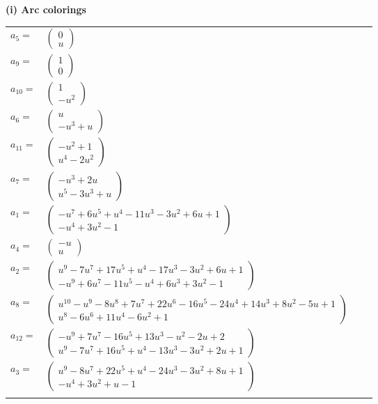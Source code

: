 \documentclass[1p]{elsarticle_modified}
\theoremstyle{definition}
\begin{document}
\flushleft \textbf{(i) Arc colorings}\\
\begin{tabular}{m{7pt} m{180pt} m{7pt} m{180pt} }
\flushright $a_{5}=$&$\begin{pmatrix}0\\u\end{pmatrix}$ \\
\flushright $a_{9}=$&$\begin{pmatrix}1\\0\end{pmatrix}$ \\
\flushright $a_{10}=$&$\begin{pmatrix}1\\- u^2\end{pmatrix}$ \\
\flushright $a_{6}=$&$\begin{pmatrix}u\\- u^3+u\end{pmatrix}$ \\
\flushright $a_{11}=$&$\begin{pmatrix}- u^2+1\\u^4-2 u^2\end{pmatrix}$ \\
\flushright $a_{7}=$&$\begin{pmatrix}- u^3+2 u\\u^5-3 u^3+u\end{pmatrix}$ \\
\flushright $a_{1}=$&$\begin{pmatrix}- u^7+6 u^5+u^4-11 u^3-3 u^2+6 u+1\\- u^4+3 u^2-1\end{pmatrix}$ \\
\flushright $a_{4}=$&$\begin{pmatrix}- u\\u\end{pmatrix}$ \\
\flushright $a_{2}=$&$\begin{pmatrix}u^9-7 u^7+17 u^5+u^4-17 u^3-3 u^2+6 u+1\\- u^9+6 u^7-11 u^5- u^4+6 u^3+3 u^2-1\end{pmatrix}$ \\
\flushright $a_{8}=$&$\begin{pmatrix}u^{10}- u^9-8 u^8+7 u^7+22 u^6-16 u^5-24 u^4+14 u^3+8 u^2-5 u+1\\u^8-6 u^6+11 u^4-6 u^2+1\end{pmatrix}$ \\
\flushright $a_{12}=$&$\begin{pmatrix}- u^9+7 u^7-16 u^5+13 u^3- u^2-2 u+2\\u^9-7 u^7+16 u^5+u^4-13 u^3-3 u^2+2 u+1\end{pmatrix}$ \\
\flushright $a_{3}=$&$\begin{pmatrix}u^9-8 u^7+22 u^5+u^4-24 u^3-3 u^2+8 u+1\\- u^4+3 u^2+u-1\end{pmatrix}$\\&\end{tabular}
\end{document}
